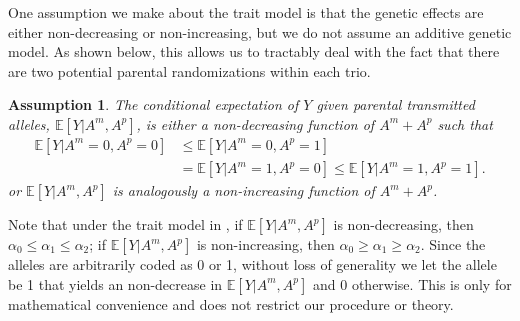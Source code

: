 \documentclass[12pt]{extarticle}
\newtheorem{asm}{Assumption}%
\newcommand{\E}{\mathbb{E}}
\begin{document}
One assumption we make about the trait model is that the genetic effects are either non-decreasing or non-increasing, but we do not assume an additive genetic model. As shown below, this allows us to tractably deal with the fact that there are two potential parental randomizations within each trio. 
\begin{asm}\label{asm:genetic_model}
The conditional expectation of $Y$ given parental transmitted alleles, $\mathbb{E}[Y|A^m, A^p]$, is either a non-decreasing function of $A^m+A^p$ such that
\begin{align*}
\E[Y|A^m=0,A^p=0] &\leq \E[Y|A^m=0,A^p=1] \\
&= \E[Y|A^m=1,A^p=0] \leq \E[Y|A^m=1,A^p=1]. 
\end{align*}
or $\mathbb{E}[Y|A^m, A^p]$ is analogously a non-increasing function of $A^m+A^p$. 
\end{asm}

\noindent Note that under the trait model in , if $\E[Y|A^m,A^p]$ is non-decreasing, then $\alpha_0 \leq \alpha_1 \leq \alpha_2$; if $\E[Y|A^m,A^p]$ is non-increasing, then $\alpha_0 \geq \alpha_1 \geq \alpha_2$. Since the alleles are arbitrarily coded as 0 or 1, without loss of generality we let the allele be 1 that yields an non-decrease in $\E[Y|A^m, A^p]$ and 0 otherwise. This is only for mathematical convenience and does not restrict our procedure or theory. 
\end{document}
